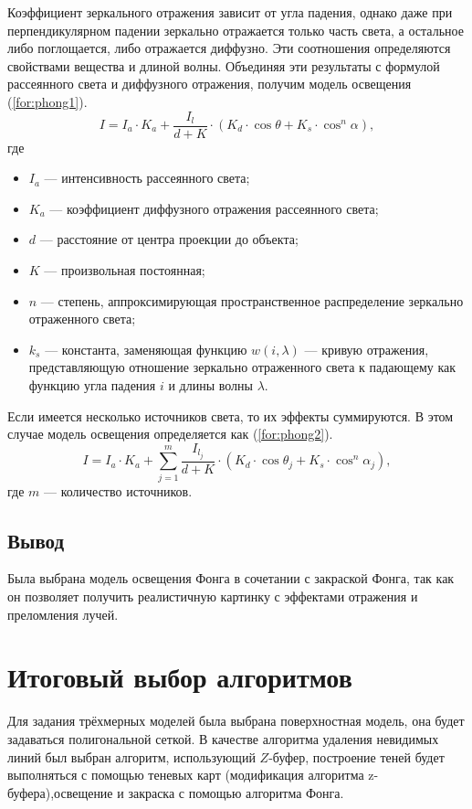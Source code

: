 Коэффициент зеркального отражения зависит от угла падения, однако даже при перпендикулярном падении зеркально отражается только часть света, а остальное либо поглощается, либо отражается диффузно. Эти соотношения определяются свойствами вещества и длиной волны. Объединяя эти результаты с формулой рассеянного света и диффузного отражения, получим модель освещения (\ref{for:phong1}).
\begin{equation} 
	\label{for:phong1}
	I = I_a \cdot K_a + \frac{I_l}{d + K} \cdot (K_d \cdot \cos{\theta} + K_s \cdot \cos^n{\alpha}),
\end{equation}
где
\begin{itemize}
	\item $I_a$ --- интенсивность рассеянного света;
	\item $K_a$ --- коэффициент диффузного отражения рассеянного света;
	\item $d$ --- расстояние от центра проекции до объекта;
	\item $K$ --- произвольная постоянная;
	\item $n$ --- степень, аппроксимирующая пространственное распределение зеркально отраженного света;
	\item $k_s$ --- константа, заменяющая функцию $w(i, \lambda)$ --- кривую отражения, представляющую отношение зеркально отраженного света к падающему как функцию угла падения $i$ и длины волны $\lambda$.
\end{itemize}


Если имеется несколько источников света, то их эффекты суммируются. В этом случае модель освещения определяется как (\ref{for:phong2}).
\begin{equation} 
	\label{for:phong2}
	I = I_a \cdot K_a + \sum_{j=1}^{m}\frac{I_{l_j}}{d + K} \cdot (K_d \cdot \cos{\theta_j} + K_s \cdot \cos^n{\alpha_j}),
\end{equation}
где $m$ --- количество источников.

\subsection{Вывод}

Была выбрана модель освещения Фонга в сочетании с закраской Фонга, так как он позволяет получить реалистичную картинку с эффектами отражения и преломления лучей. 


\section{Итоговый выбор алгоритмов} 

Для задания трёхмерных моделей была выбрана поверхностная модель, она будет задаваться полигональной сеткой. В качестве алгоритма удаления невидимых линий был выбран алгоритм, использующий $Z$-буфер, построение теней будет выполняться с помощью теневых карт (модификация алгоритма z-буфера),освещение и закраска с помощью алгоритма Фонга.

